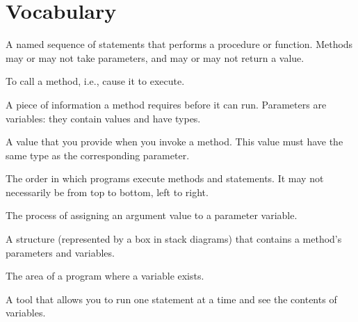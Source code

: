 \section{Vocabulary}

\begin{description}

A named sequence of statements that performs a procedure or function.
Methods may or may not take parameters, and may or may not return a value.

To call a method, i.e., cause it to execute.

A piece of information a method requires before it can run.
Parameters are variables: they contain values and have types.

A value that you provide when you invoke a method.
This value must have the same type as the corresponding parameter.

The order in which programs execute methods and statements.
It may not necessarily be from top to bottom, left to right.

The process of assigning an argument value to a parameter variable.

A structure (represented by a box in stack diagrams) that contains a method's parameters and variables.

The area of a program where a variable exists.

A tool that allows you to run one statement at a time and see the contents of variables.

\end{description}
